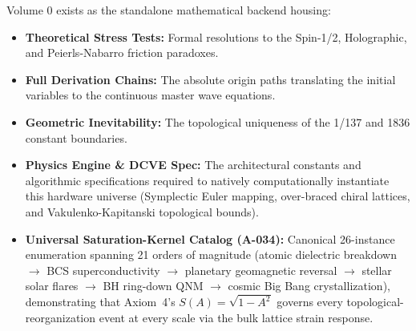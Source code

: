 \noindent Volume 0 exists as the standalone mathematical backend housing:
\begin{itemize}
    \item \textbf{Theoretical Stress Tests:} Formal resolutions to the Spin-1/2, Holographic, and Peierls-Nabarro friction paradoxes.
    \item \textbf{Full Derivation Chains:} The absolute origin paths translating the initial variables to the continuous master wave equations.
    \item \textbf{Geometric Inevitability:} The topological uniqueness of the 1/137 and 1836 constant boundaries.
    \item \textbf{Physics Engine \& DCVE Spec:} The architectural constants and algorithmic specifications required to natively computationally instantiate this hardware universe (Symplectic Euler mapping, over-braced chiral lattices, and Vakulenko-Kapitanski topological bounds).
    \item \textbf{Universal Saturation-Kernel Catalog (A-034):} Canonical 26-instance enumeration spanning 21 orders of magnitude (atomic dielectric breakdown $\to$ BCS superconductivity $\to$ planetary geomagnetic reversal $\to$ stellar solar flares $\to$ BH ring-down QNM $\to$ cosmic Big Bang crystallization), demonstrating that Axiom~4's $S(A) = \sqrt{1 - A^2}$ governs every topological-reorganization event at every scale via the bulk lattice strain response.
\end{itemize}





